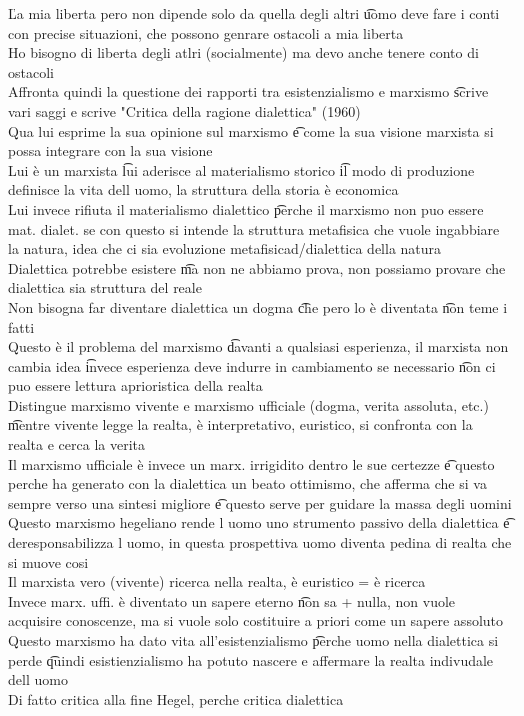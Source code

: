 \documentclass[12pt]{article}
\begin{document}
\v

La mia liberta pero non dipende solo da quella degli altri \t uomo deve fare i conti con precise situazioni, che possono genrare ostacoli a mia liberta \\
Ho bisogno di liberta degli atlri (socialmente) ma devo anche tenere conto di ostacoli \\
Affronta quindi la questione dei rapporti tra esistenzialismo e marxismo \t scrive vari saggi e scrive "Critica della ragione dialettica" (1960) \\
Qua lui esprime la sua opinione sul marxismo \t e come la sua visione marxista si possa integrare con la sua visione \\
Lui è un marxista \t lui aderisce al materialismo storico \t il modo di produzione definisce la vita dell uomo, la struttura della storia è economica \\
Lui invece rifiuta il materialismo dialettico \t perche il marxismo non puo essere mat. dialet. se con questo si intende la struttura metafisica che vuole ingabbiare la natura, idea che ci sia evoluzione metafisicad/dialettica della natura \\
Dialettica potrebbe esistere \t ma non ne abbiamo prova, non possiamo provare che dialettica sia struttura del reale \\
Non bisogna far diventare dialettica un dogma \t che pero lo è diventata \t non teme i fatti \\
Questo è il problema del marxismo \t davanti a qualsiasi esperienza, il marxista non cambia idea \t invece esperienza deve indurre in cambiamento se necessario \t non ci puo essere lettura aprioristica della realta \\
Distingue marxismo vivente e marxismo ufficiale (dogma, verita assoluta, etc.) \t mentre vivente legge la realta, è interpretativo, euristico, si confronta con la realta e cerca la verita \\
Il marxismo ufficiale è invece un marx. irrigidito dentro le sue certezze \t e questo perche ha generato con la dialettica un beato ottimismo, che afferma che si va sempre verso una sintesi migliore \t e questo serve per guidare la massa degli uomini \\
Questo marxismo hegeliano rende l uomo uno strumento passivo della dialettica \t e deresponsabilizza l uomo, in questa prospettiva uomo diventa pedina di realta che si muove cosi \\
Il marxista vero (vivente) ricerca nella realta, è euristico = è ricerca \\
Invece marx. uffi. è diventato un sapere eterno \t non sa + nulla, non vuole acquisire conoscenze, ma si vuole solo costituire a priori come un sapere assoluto \\
Questo marxismo ha dato vita all'esistenzialismo \t perche uomo nella dialettica si perde \t quindi esistienzialismo ha potuto nascere e affermare la realta indivudale dell uomo \\
Di fatto critica alla fine Hegel, perche critica dialettica
\end{document}
